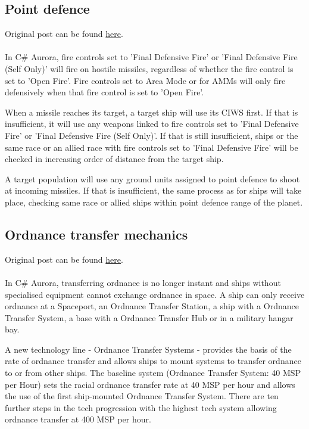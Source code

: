 \documentclass[../Aurora C# unofficial manual.tex]{subfiles}
\begin{document}
	\subsection{Point defence}
	Original post can be found
	\href{http://aurora2.pentarch.org/index.php?topic=8495.msg107268#msg107268}{here}.
	\\\\
	
	In C\# Aurora, fire controls set to 'Final Defensive Fire' or 'Final Defensive Fire (Self Only)' will fire on hostile missiles, regardless of whether the fire control is set to 'Open Fire'. Fire controls set to Area Mode or for AMMs will only fire defensively when that fire control is set to 'Open Fire'.
	
	When a missile reaches its target, a target ship will use its CIWS first. If that is insufficient, it will use any weapons linked to fire controls set to 'Final Defensive Fire' or 'Final Defensive Fire (Self Only)'. If that is still insufficient, ships or the same race or an allied race with fire controls set to 'Final Defensive Fire' will be checked in increasing order of distance from the target ship.
	
	A target population will use any ground units assigned to point defence to shoot at incoming missiles. If that is insufficient, the same process as for ships will take place, checking same race or allied ships within point defence range of the planet.
	
	
	\subsection{Ordnance transfer mechanics}
	Original post can be found
	\href{http://aurora2.pentarch.org/index.php?topic=8495.msg104195#msg104195}{here}.
	\\\\
	
	In C\# Aurora, transferring ordnance is no longer instant and ships without specialised equipment cannot exchange ordnance in space. A ship can only receive ordnance at a Spaceport, an Ordnance Transfer Station, a ship with a Ordnance Transfer System, a base with a Ordnance Transfer Hub or in a military hangar bay.
	
	A new technology line - Ordnance Transfer Systems - provides the basis of the rate of ordnance transfer and allows ships to mount systems to transfer ordnance to or from other ships. The baseline system (Ordnance Transfer System: 40 MSP per Hour) sets the racial ordnance transfer rate at 40 MSP per hour and allows the use of the first ship-mounted Ordnance Transfer System. There are ten further steps in the tech progression with the highest tech system allowing ordnance transfer at 400 MSP per hour.
	
\end{document}
